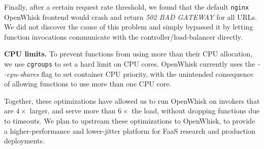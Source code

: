 Finally, after a certain request rate threshold, we found that the default \texttt{nginx} OpenWhisk frontend would crash and return \textit{502 BAD GATEWAY} for all URLs. 
We did not discover the cause of this problem and simply bypassed it by letting function invocations communicate with the controller/load-balancer directly. 

\noindent \textbf{CPU limits.}
To prevent functions from using more than their CPU allocation, we use \texttt{cgroups} to set a hard limit on CPU cores. 
%
OpenWhisk currently uses the \textit{-{}-cpu-shares} flag to set container CPU priority, with the unintended consequence of allowing functions to use more than one CPU core.


Together, these optimizations have allowed us to run OpenWhisk on invokers that are $4\times$ larger, and serve more than $6\times$ the load, without dropping functions due to timeouts.
%
We plan to upstream these optimizations to OpenWhisk, to provide a higher-performance and lower-jitter platform for FaaS research and production deployments. 

\begin{comment}
\noindent \textbf{docker pause.} 
OpenWhisk pauses Docker containers after each invocation completes to prevent the user code from continuing to run.
We disable this pausing because it causes significant contention inside Docker, affecting both latency and the ability to run more concurrent functions on an individual server.
Because we control the code running inside all our functions, we do not need the pausing as a security concern or to limit impact on load.
Our functions do not do anything outside of an invocation.

\noindent \textbf{configuration.}
While OpenWhisk provides a large number of configurable settings, most of them are locked into files.
In order to make the settings more amenable to prototyping and rapid changes, we converted many of them to also work as injectable environment variables.


\end{comment}





